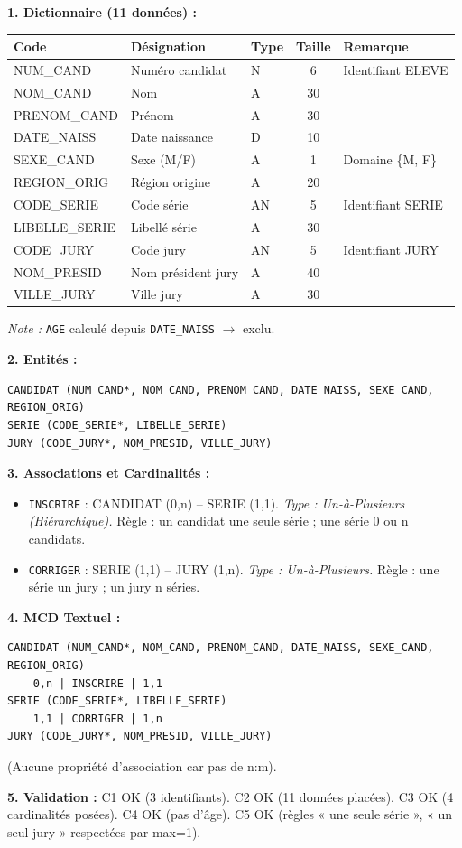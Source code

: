 \documentclass[11pt]{article}
\begin{document}
\begin{corrige}
\textbf{1. Dictionnaire (11 données) :}
\begin{center}
\begin{tabularx}{\linewidth}{|l|X|l|c|X|}
\hline
\rowcolor{popblueL} \textbf{Code} & \textbf{Désignation} & \textbf{Type} & \textbf{Taille} & \textbf{Remarque} \\
\hline
NUM\_CAND & Numéro candidat & N & 6 & Identifiant ELEVE \\
\hline
NOM\_CAND & Nom & A & 30 & \\
\hline
PRENOM\_CAND & Prénom & A & 30 & \\
\hline
DATE\_NAISS & Date naissance & D & 10 & \\
\hline
SEXE\_CAND & Sexe (M/F) & A & 1 & Domaine \{M, F\} \\
\hline
REGION\_ORIG & Région origine & A & 20 & \\
\hline
CODE\_SERIE & Code série & AN & 5 & Identifiant SERIE \\
\hline
LIBELLE\_SERIE & Libellé série & A & 30 & \\
\hline
CODE\_JURY & Code jury & AN & 5 & Identifiant JURY \\
\hline
NOM\_PRESID & Nom président jury & A & 40 & \\
\hline
VILLE\_JURY & Ville jury & A & 30 & \\
\hline
\end{tabularx}
\end{center}
\textit{Note :} \texttt{AGE} calculé depuis \texttt{DATE\_NAISS} $\rightarrow$ exclu.

\textbf{2. Entités :}
\begin{lstlisting}
CANDIDAT (NUM_CAND*, NOM_CAND, PRENOM_CAND, DATE_NAISS, SEXE_CAND, REGION_ORIG)
SERIE (CODE_SERIE*, LIBELLE_SERIE)
JURY (CODE_JURY*, NOM_PRESID, VILLE_JURY)
\end{lstlisting}

\textbf{3. Associations et Cardinalités :}
\begin{itemize}
  \item \texttt{INSCRIRE} : CANDIDAT (0,n) -- SERIE (1,1). \textit{Type : Un-à-Plusieurs (Hiérarchique).} Règle : un candidat une seule série ; une série 0 ou n candidats.
  \item \texttt{CORRIGER} : SERIE (1,1) -- JURY (1,n). \textit{Type : Un-à-Plusieurs.} Règle : une série un jury ; un jury n séries.
\end{itemize}

\textbf{4. MCD Textuel :}
\begin{lstlisting}
CANDIDAT (NUM_CAND*, NOM_CAND, PRENOM_CAND, DATE_NAISS, SEXE_CAND, REGION_ORIG)
    0,n | INSCRIRE | 1,1
SERIE (CODE_SERIE*, LIBELLE_SERIE)
    1,1 | CORRIGER | 1,n
JURY (CODE_JURY*, NOM_PRESID, VILLE_JURY)
\end{lstlisting}
(Aucune propriété d'association car pas de n:m).

\textbf{5. Validation :} C1 OK (3 identifiants). C2 OK (11 données placées). C3 OK (4 cardinalités posées). C4 OK (pas d'âge). C5 OK (règles « une seule série », « un seul jury » respectées par max=1).
\end{corrige}
\end{document}
